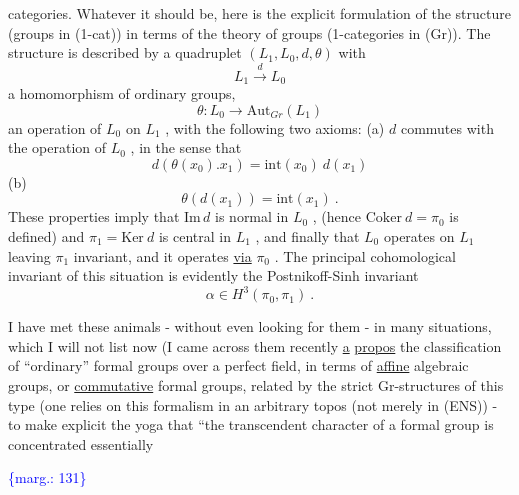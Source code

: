 \documentclass[11pt]{article}
\newcommand{\scanpage}[1]{\par\bigskip\noindent{\small\sffamily[scan #1]}\par}
\newcommand{\mspage}[1]{{\small\sffamily[p.\,#1]}}
\newcommand{\hand}[1]{\textcolor{blue}{#1}}
\newcommand{\margin}[1]{\textcolor{blue}{\{\textsf{marg.:} #1\}}}
\newcommand{\uline}[1]{\underline{#1}}
\begin{document}
\mspage{\hand{130}}

\clearpage
\scanpage{134-2/130}
\mspage{- 3 -}

categories. Whatever it should be, here is the explicit formulation
of the structure (groups in (1-cat)) in terms of the theory of
groups (1-categories in (Gr)). The structure is described by a
quadruplet $(L_1, L_0, d,\theta)$ with
\[ L_1 \xrightarrow{\ d\ } L_0 \]
a homomorphism of ordinary groups,
\[ \theta : L_0 \longrightarrow \mathrm{Aut}_{Gr}(L_1) \]
an operation of $L_0$ on $L_1$ , with the following two axioms:
(a) $d$ commutes with the operation of $L_0$ , in the
sense that
\[ d(\theta(x_0).x_1) = \mathrm{int}(x_0)\ d(x_1) \]
(b) \[ \theta(d(x_1)) = \mathrm{int}(x_1) \ . \]
These properties imply that $\mathrm{Im}\, d$ is normal in $L_0$ , (hence
$\mathrm{Coker}\ d = \pi_0$ is defined) and $\pi_1 = \mathrm{Ker}\ d$ is central in $L_1$ ,
and finally that $L_0$ operates on $L_1$ leaving $\pi_1$ invariant,
and it operates \uline{via} $\pi_0$ . The principal cohomological invariant
of this situation is evidently the Postnikoff-Sinh invariant
\[ \alpha \in H^3(\pi_0, \pi_1) \ . \]

I have met these animals - without even looking for them -
in many situations, which I will not list now (I came across them
recently \uline{a} \uline{propos} the classification of ``ordinary'' formal groups
over a perfect field, in terms of \uline{affine} algebraic groups, or
\uline{commutative} formal groups, related by the strict Gr-structures of
this type (one relies on this formalism in an arbitrary topos
(not merely in (ENS)) - to make explicit the yoga that ``the
transcendent character of a formal group is concentrated essentially

\margin{131}

\clearpage
\scanpage{134-2/131}
\mspage{- 4 -}
\end{document}

